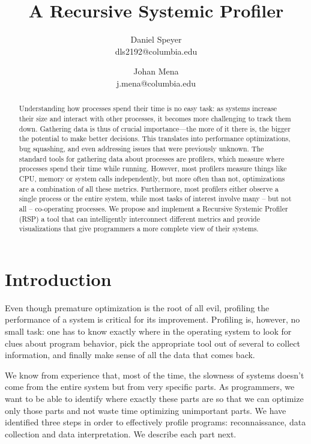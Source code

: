 \documentclass[10pt]{article}
\author{Daniel Speyer\\dls2192@columbia.edu \and Johan Mena\\j.mena@columbia.edu}
\title{\textbf{A Recursive Systemic Profiler}}
\date{}
\begin{document}
\maketitle

\begin{abstract}

Understanding how processes spend their time is no easy task: as systems
increase their size and interact with other processes, it becomes more
challenging to track them down. Gathering data is thus of crucial
importance---the more of it there is, the bigger the potential to make better
decisions.  This translates into performance optimizations, bug squashing, and
even addressing issues that were previously unknown. The standard tools for
gathering data about processes are profilers, which measure where processes
spend their time while running. However, most profilers measure things like
CPU, memory or system calls independently, but more often than not,
optimizations are a combination of all these metrics. Furthermore,
most profilers either observe a single process or the entire system,
while most tasks of interest involve many -- but not all --
co-operating processes. We propose and implement
a Recursive Systemic Profiler (RSP) a tool that can intelligently interconnect
different metrics and provide visualizations that give programmers a more
complete view of their systems.

\end{abstract}

\section{Introduction}
Even though premature optimization is the root of all evil, profiling the
performance of a system is critical for its improvement. Profiling is, however,
no small task: one has to know exactly where in the operating system to look for
clues about program behavior, pick the appropriate tool out of several to collect
information, and finally make sense of all the data that comes back.

We know from experience that, most of the time, the slowness of systems doesn't
come from the entire system but from very specific parts. As programmers, we want
to be able to identify where exactly these parts are so that we can optimize only
those parts and not waste time optimizing unimportant parts. We have identified
three steps in order to effectively profile programs: reconnaissance, data
collection and data interpretation. We describe each part next.
\end{document}
